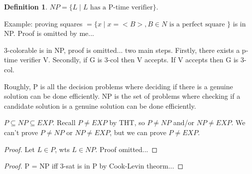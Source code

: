 \documentclass{article}
\theoremstyle{plain}
\theoremstyle{definition}
\newtheorem{definition}{Definition}[section] %
\begin{document}
\begin{definition}
$NP=\{L \mid L \text{ has a P-time verifier}\}$.
\end{definition}

Example: proving squares $= \{x \mid x=<B>, B \in N \text{ is a perfect square }\}$ is in NP. Proof is omitted by me...

3-colorable is in NP, proof is omitted... two main steps. Firstly, there exists a p-time verifier V. Secondly, if G is 3-col then V accepts. If V accepts then G is 3-col. 

Roughly, P is all the decision problems where deciding if there is a genuine solution can be done efficiently. NP is the set of problems where checking if a candidate solution is a genuine solution can be done efficiently. 

$P \subseteq NP \subseteq EXP$. Recall $P \neq EXP$ by THT, so $P\neq NP$ and/or $NP \neq EXP$. We can't prove $P\neq NP$ or $NP \neq EXP$, but we can prove $P \neq EXP$. 

\begin{proof}
Let $L\in P$, wts $L \in NP$. Proof omitted... 
\end{proof}

\begin{proof}
P = NP iff 3-sat is in P by Cook-Levin theorm...
\end{proof}








%
%
\end{document}
